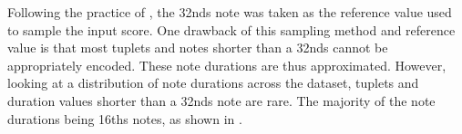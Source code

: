 
Following the practice of \textcite{micchi2020not}, the
\glspl{32nd} note was taken as the reference value used to
sample the input score. One drawback of this sampling method
and reference value is that most tuplets and notes shorter
than a \glspl{32nd} cannot be appropriately encoded. These
note durations are thus approximated. However, looking at a
distribution of note durations across the dataset, tuplets
and duration values shorter than a \glspl{32nd} note are
rare. The majority of the note durations being \glspl{16th}
notes, as shown in . 

